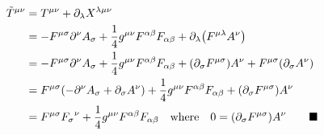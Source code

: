\documentclass{article}
\begin{document}
\begin{align*}
  \tilde{T}^{\mu\nu} & =T^{\mu\nu} +\partial_\lambda X^{\lambda\mu \nu}                                                                                                                                  \\
                     & =-F^{\mu\sigma}\partial^\nu A_\sigma +\frac{1}{4}g^{\mu\nu} F^{\alpha\beta}F_{\alpha\beta} +\partial_\lambda \pqty{F^{\mu\lambda}A^\nu}                                           \\
                     & =-F^{\mu\sigma}\partial^\nu A_\sigma +\frac{1}{4}g^{\mu\nu} F^{\alpha\beta}F_{\alpha\beta} +\pqty{\partial_\sigma F^{\mu\sigma}}A^\nu  +F^{\mu\sigma}\pqty{\partial_\sigma A^\nu} \\
                     & =F^{\mu\sigma}\pqty{-\partial^\nu A_\sigma + {\partial_\sigma A^\nu}}+\frac{1}{4}g^{\mu\nu} F^{\alpha\beta}F_{\alpha\beta} +\pqty{\partial_\sigma F^{\mu\sigma}}A^\nu             \\
                     & =F^{\mu\sigma}{F_\sigma}^\nu+\frac{1}{4}g^{\mu\nu} F^{\alpha\beta}F_{\alpha\beta} \qq{where}0=\pqty{\partial_\sigma F^{\mu\sigma}}A^\nu  \qquad\blacksquare                       \\
\end{align*}
\end{document}
